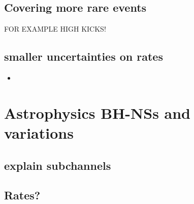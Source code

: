 \documentclass[a4paper,fleqn,usenatbib]{mnras}
\begin{document}
\subsection{Covering more rare events}

FOR EXAMPLE HIGH KICKS!


\subsection{smaller uncertainties on rates}




%
\begin{itemize}
\item 
\end{itemize}
%



\section{Astrophysics BH-NSs and variations}
\label{sec:variationsBHNS}




\subsection{explain subchannels}


\subsection{Rates?}
\end{document}
